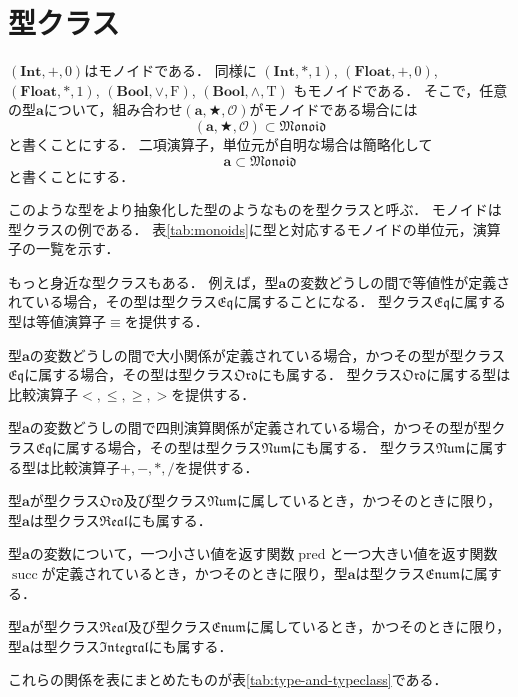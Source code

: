 \documentclass[twocolumn]{jsbook}
\newcommand{\typeclassname}[1]{\mathfrak{#1}}
\newcommand{\typeclassenum}{\typeclassname{Enum}}
\newcommand{\typeclasseq}{\typeclassname{Eq}}
\newcommand{\typeclassintegral}{\typeclassname{Integral}}
\newcommand{\typeclassmonoid}{\typeclassname{Monoid}}
\newcommand{\typeclassnum}{\typeclassname{Num}}
\newcommand{\typeclassord}{\typeclassname{Ord}}
\newcommand{\typeclassreal}{\typeclassname{Real}}
\newcommand{\typename}[1]{\mathbf{#1}}
\newcommand{\typebool}{\typename{Bool}}
\newcommand{\typeint}{\typename{Int}}
\newcommand{\typefloat}{\typename{Float}}
\newcommand{\constantname}[1]{\mathrm{#1}}
\newcommand{\constanttrue}{\constantname{T}}
\newcommand{\constantfalse}{\constantname{F}}
\newcommand{\binaryeq}{\equiv}
\newcommand{\binaryl}{<}
\newcommand{\binaryle}{\le}
\newcommand{\binaryge}{\ge}
\newcommand{\binaryg}{>}
\newcommand{\binaryadd}{+}
\newcommand{\binarysub}{-}
\newcommand{\binarymultiply}{*}
\newcommand{\binarydivide}{/}
\newcommand{\binaryor}{\vee}
\newcommand{\binaryand}{\wedge}
\newcommand{\functionpred}{\mathop{\text{pred}}}
\newcommand{\functionsucc}{\mathop{\text{succ}}}
\newcommand{\isclassof}{\subset}
\newcommand{\mathbinaryop}{\bigstar}
\newcommand{\mathidentity}{\mathcal{O}}
\newcommand{\mathtriple}[3]{(#1,#2,#3)}
\begin{document}
\section{型クラス}

$\mathtriple{\typeint}{+}{0}$はモノイドである．
同様に $\mathtriple{\typeint}{*}{1}$, $\mathtriple{\typefloat}{+}{0}$, $\mathtriple{\typefloat}{*}{1}$, $\mathtriple{\typebool}{\binaryor}{\constantfalse}$, $\mathtriple{\typebool}{\binaryand}{\constanttrue}$ もモノイドである．
そこで，任意の型$\typename{a}$について，組み合わせ$\mathtriple{\typename{a}}{\mathbinaryop}{\mathidentity}$がモノイドである場合には$$\mathtriple{\typename{a}}{\mathbinaryop}{\mathidentity}\isclassof\typeclassmonoid$$と書くことにする．
二項演算子，単位元が自明な場合は簡略化して$$\typename{a}\isclassof\typeclassmonoid$$と書くことにする．

このような型をより抽象化した型のようなものを型クラスと呼ぶ．
モノイドは型クラスの例である．
表\ref{tab:monoids}に型と対応するモノイドの単位元，演算子の一覧を示す．

もっと身近な型クラスもある．
例えば，型$\typename{a}$の変数どうしの間で等値性が定義されている場合，その型は型クラス$\typeclasseq$に属することになる．
型クラス$\typeclasseq$に属する型は等値演算子$\binaryeq$を提供する．

型$\typename{a}$の変数どうしの間で大小関係が定義されている場合，かつその型が型クラス$\typeclasseq$に属する場合，その型は型クラス$\typeclassord$にも属する．
型クラス$\typeclassord$に属する型は比較演算子$\binaryl,\binaryle,\binaryge,\binaryg$を提供する．

型$\typename{a}$の変数どうしの間で四則演算関係が定義されている場合，かつその型が型クラス$\typeclasseq$に属する場合，その型は型クラス$\typeclassnum$にも属する．
型クラス$\typeclassnum$に属する型は比較演算子$\binaryadd,\binarysub,\binarymultiply,\binarydivide$を提供する．

型$\typename{a}$が型クラス$\typeclassord$及び型クラス$\typeclassnum$に属しているとき，かつそのときに限り，型$\typename{a}$は型クラス$\typeclassreal$にも属する．

型$\typename{a}$の変数について，一つ小さい値を返す関数$\functionpred$と一つ大きい値を返す関数$\functionsucc$が定義されているとき，かつそのときに限り，型$\typename{a}$は型クラス$\typeclassenum$に属する．

型$\typename{a}$が型クラス$\typeclassreal$及び型クラス$\typeclassenum$に属しているとき，かつそのときに限り，型$\typename{a}$は型クラス$\typeclassintegral$にも属する．

これらの関係を表にまとめたものが表\ref{tab:type-and-typeclass}である．
\end{document}
